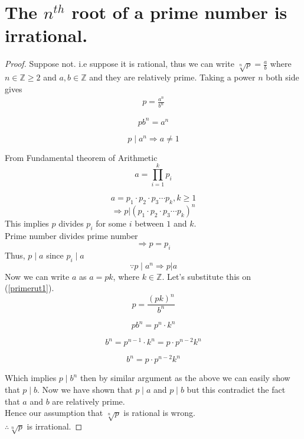 \documentclass[12pt]{article}
\begin{document}
\section{The $n^{th}$ root of a prime number is irrational.}
\begin{proof}
Suppose not. i.e suppose it is rational, thus we can write $\sqrt[n]{p}=\frac{a}{b}$  where $n \in \mathbb{Z}\geq2$ and  $a,b \in \mathbb{Z}$ and they are relatively prime. Taking a power $n$ both side gives
\begin{align}\label{primerut1}
{p}=\frac{a^n}{b^n}
\end{align}

$$
pb^n=a^n
$$

$$
p\mid a^n  \Rightarrow a\neq 1
$$

From Fundamental theorem of Arithmetic
\begin{equation}
a= \prod_{i=1}^{k} p_i
\end{equation}

$$
a=p_1\cdot p_2\cdot p_3\cdots p_k  ,k\geq 1
$$
$$
\Rightarrow p|(p_1\cdot p_2\cdot p_3\cdots p_k )^n
$$
This implies $p$ divides $p_i$  for some $i$ between $1$ and $k$.\\
Prime number divides prime number
$$ \Rightarrow p=p_i$$
Thus, $ p\mid a$ since $p_i \mid a$
\[
\because p\mid a^n \Rightarrow p|a
\]
Now we can write $a$ as $a=pk$, where $k \in \mathbb{Z}$. Let's substitute this on (\ref{primerut1}).
\[
p=\frac {(pk)^n}{b^n}
\]

$$
pb^n=p^n \cdot k^n
$$

$$
b^n = p^{n-1}\cdot k^n=p\cdot p^{n-2} k^n
$$

$$
b^n=p\cdot p^{n-2} k^n
$$

\noindent Which implies $p\mid b^n$ then by similar argument as the above we can easily show that $p\mid b$.
Now we have shown that $p\mid a$ and $p\mid b$ but this contradict the fact that $a$ and $b$ are relatively prime.\\
Hence our assumption that $\sqrt[n]{p}$ is rational is wrong.\\  $\therefore \sqrt[n]{p}$ is irrational.
\end{proof}
\end{document}
